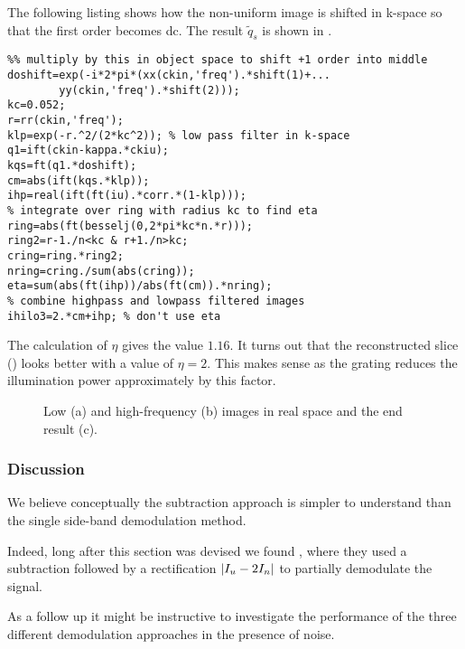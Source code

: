 The following listing shows how the non-uniform image is shifted in
k-space so that the first order becomes dc. The result $\tilde q_s$
is shown in .
\begin{lstlisting}
%% multiply by this in object space to shift +1 order into middle
doshift=exp(-i*2*pi*(xx(ckin,'freq').*shift(1)+...
        yy(ckin,'freq').*shift(2)));
kc=0.052;
r=rr(ckin,'freq');
klp=exp(-r.^2/(2*kc^2)); % low pass filter in k-space
q1=ift(ckin-kappa.*ckiu);
kqs=ft(q1.*doshift);
cm=abs(ift(kqs.*klp));
ihp=real(ift(ft(iu).*corr.*(1-klp)));
% integrate over ring with radius kc to find eta
ring=abs(ft(besselj(0,2*pi*kc*n.*r)));
ring2=r-1./n<kc & r+1./n>kc;
cring=ring.*ring2;
nring=cring./sum(abs(cring));
eta=sum(abs(ft(ihp))/abs(ft(cm)).*nring);
% combine highpass and lowpass filtered images
ihilo3=2.*cm+ihp; % don't use eta
\end{lstlisting}
The calculation of $\eta$ gives the value $1.16$. It turns out that
the reconstructed slice () looks better with a
value of $\eta=2$. This makes sense as the grating reduces the
illumination power approximately by this factor.
\begin{figure}[htb]
  \centering {}
  \caption{Low (a) and high-frequency (b) images in real space and the
    end result (c).}
  \label{fig:hilo3_3}
\end{figure}
\subsubsection{Discussion}
We believe conceptually the subtraction approach is simpler to
understand than the single side-band demodulation method. 

Indeed, long after this section was devised we found \cite{Mertz2010},
where they used a subtraction followed by a rectification
$\mathopen| I_u-2I_n \mathclose|$ to partially demodulate the signal.

As a follow up it might be instructive to investigate the performance
of the three different demodulation approaches in the presence of
noise.
